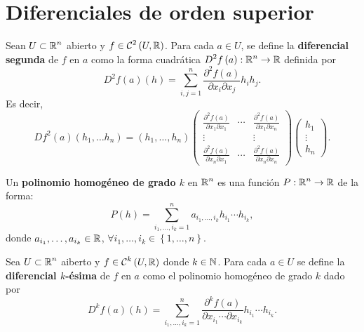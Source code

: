 \section{Diferenciales de orden superior}
\begin{definition}
Sean $\displaystyle U \subset \mathbb{R}^{n} $ abierto y $\displaystyle f \in \mathcal{C}^{2}\left(U, \mathbb{R}\right) $. Para cada $\displaystyle a \in U $, se define la \textbf{diferencial segunda} de $\displaystyle f $ en $\displaystyle a $ como la forma cuadrática $\displaystyle D^{2}f\left(a\right) : \mathbb{R}^{n} \to \mathbb{R} $ definida por 
\[D^{2}f\left(a\right)\left(h\right) = \sum^{n}_{i,j = 1}\frac{\partial^{2}f\left(a\right)}{\partial x_{i}\partial x_{j}}h_{i}h_{j} .\]
Es decir, 
\[Df^{2}\left(a\right) \left(h_{1}, \ldots h_{n}\right) = \left(h_{1}, \ldots, h_{n}\right)\begin{pmatrix} \frac{\partial^{2}f\left(a\right)}{\partial x_{1}\partial x_{1}} & \cdots & \frac{\partial^{2}f\left(a\right)}{\partial x_{1}\partial x_{n}} \\ 
\vdots & & \vdots \\
\frac{\partial^{2}f\left(a\right)}{\partial x_{n}\partial x_{1}} & \cdots & \frac{\partial^{2}f\left(a\right)}{\partial x_{n}\partial x_{n}}\end{pmatrix}\begin{pmatrix} h_{1} \\ \vdots \\ h_{n}\end{pmatrix} .\]
\end{definition}
\begin{definition}
Un \textbf{polinomio homogéneo de grado $\displaystyle k $} en $\displaystyle \mathbb{R}^{n} $ es una función $\displaystyle P : \mathbb{R}^{n} \to \mathbb{R} $ de la forma:
\[P\left(h\right) = \sum^{n}_{i_{1}, \ldots, i_{k} = 1}a_{i_{1}, \ldots, i_{k}}h_{i_{1}}\cdots h_{i_{k}} ,\]
donde $\displaystyle a_{i_{1}}, \ldots, a_{i_{k}} \in \mathbb{R} $, $\displaystyle \forall i_{1}, \ldots, i_{k} \in \left\{ 1, \ldots, n\right\}  $.
\end{definition}
\begin{definition}
Sea $\displaystyle U \subset \mathbb{R}^{n} $ aiberto y $\displaystyle f \in \mathcal{C}^{k}\left(U,\mathbb{R}\right) $ donde $\displaystyle k \in \mathbb{N} $. Para cada $\displaystyle a \in U $ se define la \textbf{diferencial $\displaystyle k $-ésima} de $\displaystyle f $ en $\displaystyle a $ como el polinomio homogéneo de grado $\displaystyle k $ dado por
\[D^{k}f\left(a\right)\left(h\right) = \sum^{n}_{i_{1}, \ldots, i_{k}= 1}\frac{\partial^{k}f\left(a\right)}{\partial x_{i_{1}} \cdots \partial x_{i_{k}}}h_{i_{1}} \cdots h_{i_{k}} .\]
\end{definition}
